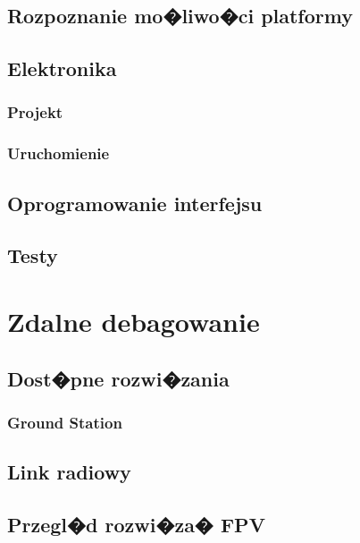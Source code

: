 \documentclass[12pt,a4paper,twoside,openright,fleqn]{mwrep}
\begin{document}
		\subsection{Rozpoznanie mo�liwo�ci platformy}
		
		\subsection{Elektronika}
		
			\subsubsection{Projekt}
			
			\subsubsection{Uruchomienie}
			
		\subsection{Oprogramowanie interfejsu}
		
		\subsection{Testy}
		
		
	\section{Zdalne debagowanie}
	
		\subsection{Dost�pne rozwi�zania}
		
			\subsubsection{Ground Station}	
			
		\subsection{Link radiowy}
		
		\subsection{Przegl�d rozwi�za� FPV}
		
		
\end{document}
